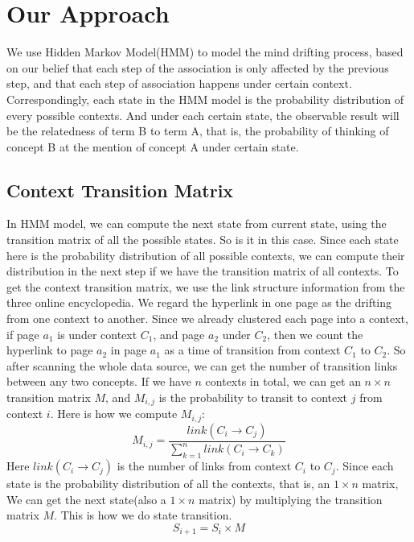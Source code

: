 \section{Our Approach}
\label{sec:approach}

We use Hidden Markov Model(HMM) to model the mind drifting process,
based on our belief that each step of the association is only affected by
the previous step, and that each step of association happens under
certain context. Correspondingly, each state in the HMM model is the
probability distribution of every possible contexts.
And under each certain state, the observable result will be the
relatedness of term B to term A, that is, the probability of thinking of
concept B at the mention of concept A under certain state.

\subsection{Context Transition Matrix}
In HMM model, we can compute the next state from current state,
using the transition matrix of all the possible states. So is it in this case.
Since each state here is the probability distribution of all possible contexts,
we can compute their distribution in the next step if we have
the transition matrix of all contexts. To get the context transition matrix,
we use the link structure information from the three online encyclopedia.
We regard the hyperlink in one page as the drifting from one context
to another. Since we already clustered each page into a context,
if page $a_1$ is under context $C_1$, and page $a_2$ under $C_2$,
then we count the hyperlink to page $a_2$ in page $a_1$ as
a time of transition from context $C_1$ to $C_2$.
So after scanning the whole data source, we can get the number of transition links
between any two concepts. If we have $n$  contexts in total,
we can get an $n\times n$ transition matrix $M$,
and $M_{i,j}$ is the probability to transit to context $j$ from context $i$.
Here is how we compute $M_{i,j}$:
\begin{equation}
M_{i,j}=\frac{link(C_i\rightarrow C_j)}{\sum_{k=1}^nlink(C_i\rightarrow C_k)}
\end{equation}
Here $link(C_i\rightarrow C_j)$ is the number of links from context $C_i$ to $C_j$.
Since each state is the probability distribution of all the contexts, that is,
an $1\times n$ matrix, We can get the next state(also a $1\times n$ matrix) by multiplying
the transition matrix $M$. This is how we do state transition.
\begin{equation}
S_{i+1}=S_i\times M
\end{equation}

